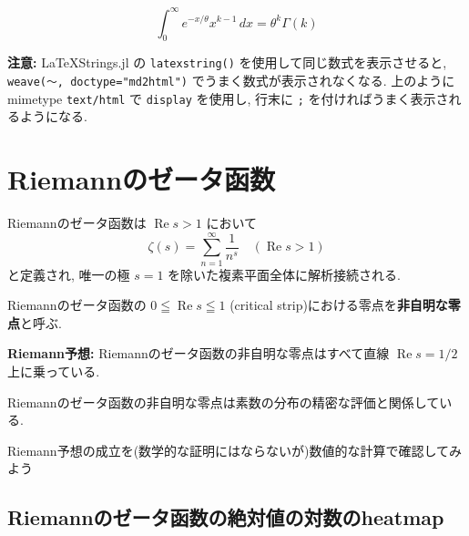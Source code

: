 \documentclass[12pt,a4paper,xelatex,ja=standard]{bxjsarticle}
\newcommand\real{\operatorname{Re}}
\begin{document}
$$\int_0^\infty e^{-x/\theta} x^{k-1}\,dx = \theta^{k} \Gamma\left(k\right)$$

\textbf{注意:} LaTeXStrings.jl の \texttt{latexstring()} を使用して同じ数式を表示させると, \texttt{weave(～, doctype="md2html")} でうまく数式が表示されなくなる. 上のように mimetype \texttt{text/html} で \texttt{display} を使用し, 行末に \texttt{;} を付ければうまく表示されるようになる.

\section{Riemannのゼータ函数}
Riemannのゼータ函数は $\real s > 1$ において
\[
\zeta(s) = \sum_{n=1}^\infty \frac{1}{n^s} \quad (\real s > 1)
\]
と定義され, 唯一の極 $s=1$ を除いた複素平面全体に解析接続される. 

Riemannのゼータ函数の $0\leqq \real s\leqq 1$ (critical strip)における零点を\textbf{非自明な零点}と呼ぶ. 

\textbf{Riemann予想:} Riemannのゼータ函数の非自明な零点はすべて直線 $\real s=1/2$ 上に乗っている. 

Riemannのゼータ函数の非自明な零点は素数の分布の精密な評価と関係している.

Riemann予想の成立を(数学的な証明にはならないが)数値的な計算で確認してみよう

\subsection{Riemannのゼータ函数の絶対値の対数のheatmap}
\end{document}
